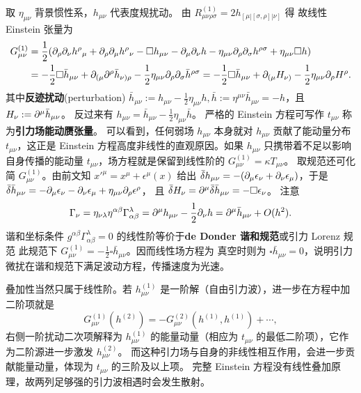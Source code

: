 取 $\eta_{\mu\nu}$ 背景惯性系，$h_{\mu\nu}$ 代表度规扰动。
由 $R^{(1)}_{\mu\nu\rho\sigma} = 2h_{[\mu|[\sigma,\rho]|\nu]}$ 得
故线性 Einstein 张量为
\begin{align}
    G_{\mu\nu}^{(1)}&=\frac12 (\partial_\rho\partial_\nu h^\rho{}_\mu+\partial_\rho\partial_\mu h^\rho{}_\nu-\square h_{\mu\nu}-\partial_\mu\partial_\nu h-\eta_{\mu\nu}\partial_\rho\partial_\sigma h^{\rho\sigma}+\eta_{\mu\nu}\square h)\notag\\
    &=-\frac12\square\bar h_{\mu\nu}+\partial_{(\mu}\partial^\rho\bar h_{\nu)\rho}-\frac12\eta_{\mu\nu}\partial_\rho\partial_\sigma\bar h^{\rho\sigma}=-\frac12\square\bar h_{\mu\nu}+\partial_{(\mu}H_{\nu)}-\frac12\eta_{\mu\nu}\partial_\rho H^\rho.
\end{align}
其中\textbf{反迹扰动}(perturbation) $\bar h_{\mu\nu}:=h_{\mu\nu}-\frac12\eta_{\mu\nu}h,\bar h:=\eta^{\mu\nu}\bar h_{\mu\nu}=-h$，且$H_\nu:=\partial^\mu\bar h_{\mu\nu}$。
反过来有 $h_{\mu\nu}=\bar h_{\mu\nu}-\frac12\eta_{\mu\nu}\bar h$。
严格的 Einstein 方程可写作
$t_{\mu\nu}$ 称为\textbf{引力场能动赝张量}。
可以看到，任何弱场 $h_{\mu\nu}$ 本身就对 $h_{\mu\nu}$ 贡献了能动量分布 $t_{\mu\nu}$，这正是 Einstein 方程高度非线性的直观原因。如果 $h_{\mu\nu}$ 只携带着不足以影响自身传播的能动量 $t_{\mu\nu}$，场方程就是保留到线性阶的 $G_{\mu\nu}^{(1)} = \kappa T_{\mu\nu}$。
取规范还可化简 $G_{\mu\nu}^{(1)}$。由前文知 $x'^\mu=x^\mu+\epsilon^\mu(x)$ 给出 $\bar\var h_{\mu\nu}=-(\partial_\mu\epsilon_\nu+\partial_\nu\epsilon_\mu)$，于是 $\bar\var\bar h_{\mu\nu}=-\partial_\mu\epsilon_\nu-\partial_\nu\epsilon_\mu+\eta_{\mu\nu}\partial_\rho\epsilon^\rho$，
且 $\bar\var H_\nu=\partial^\mu\bar\var\bar h_{\mu\nu}=-\square\epsilon_\nu$。
注意
\[
    \Gamma_\nu=\eta_{\nu\lambda}\eta^{\alpha\beta}\Gamma^\lambda_{\alpha\beta}
    =\partial^\mu h_{\mu\nu}-\frac12\partial_\nu h
    =\partial^\mu\bar h_{\mu\nu}+O(h^2).
\]
谐和坐标条件 $g^{\alpha\beta}\Gamma^\lambda_{\alpha\beta}=0$ 的线性阶等价于\textbf{de Donder 谐和规范}或引力 Lorenz 规范
此规范下 $G_{\mu\nu}^{(1)}=-\frac12\square\bar h_{\mu\nu}$。因而线性场方程为
真空时则为 $\square\bar h_{\mu\nu}=0$，说明引力微扰在谐和规范下满足波动方程，传播速度为光速。

叠加性当然只属于线性阶。若 $h_{\mu\nu}^{(1)}$ 是一阶解（自由引力波），进一步在方程中加二阶项就是
\[
    G_{\mu\nu}^{(1)}(h^{(2)})=-G_{\mu\nu}^{(2)}(h^{(1)},h^{(1)})+\cdots,
\]
右侧一阶扰动二次项解释为 $h_{\mu\nu}^{(1)}$ 的能量动量（相应为 $t_{\mu\nu}$ 的最低二阶项），它作为二阶源进一步激发 $h_{\mu\nu}^{(2)}$。
而这种引力场与自身的非线性相互作用，会进一步贡献能量动量，体现为 $t_{\mu\nu}$ 的三阶及以上项。
完整 Einstein 方程没有线性叠加原理，故两列足够强的引力波相遇时会发生散射。

